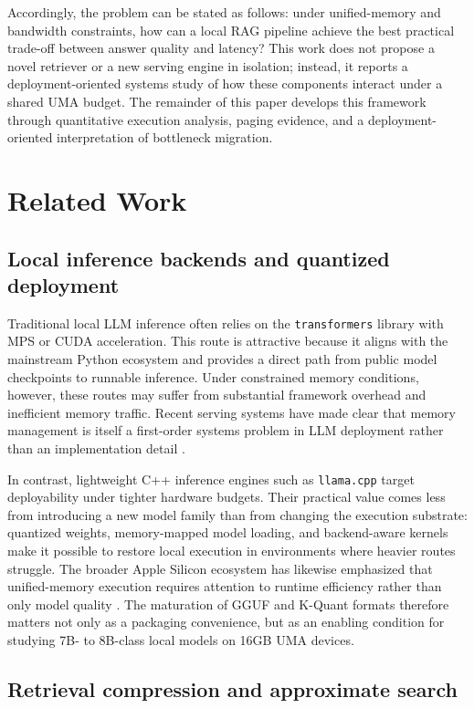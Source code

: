 \documentclass[10pt,twocolumn]{article}
\begin{document}
Accordingly, the problem can be stated as follows: under unified-memory and bandwidth constraints, how can a local RAG pipeline achieve the best practical trade-off between answer quality and latency? This work does not propose a novel retriever or a new serving engine in isolation; instead, it reports a deployment-oriented systems study of how these components interact under a shared UMA budget. The remainder of this paper develops this framework through quantitative execution analysis, paging evidence, and a deployment-oriented interpretation of bottleneck migration.

\section{Related Work}

\subsection{Local inference backends and quantized deployment}

Traditional local LLM inference often relies on the \texttt{transformers} library with MPS or CUDA acceleration. This route is attractive because it aligns with the mainstream Python ecosystem and provides a direct path from public model checkpoints to runnable inference. Under constrained memory conditions, however, these routes may suffer from substantial framework overhead and inefficient memory traffic. Recent serving systems have made clear that memory management is itself a first-order systems problem in LLM deployment rather than an implementation detail \cite{kwon2023vllm}.

In contrast, lightweight C++ inference engines such as \texttt{llama.cpp} target deployability under tighter hardware budgets. Their practical value comes less from introducing a new model family than from changing the execution substrate: quantized weights, memory-mapped model loading, and backend-aware kernels make it possible to restore local execution in environments where heavier routes struggle. The broader Apple Silicon ecosystem has likewise emphasized that unified-memory execution requires attention to runtime efficiency rather than only model quality \cite{hannun2023mlx}. The maturation of GGUF and K-Quant formats therefore matters not only as a packaging convenience, but as an enabling condition for studying 7B- to 8B-class local models on 16GB UMA devices.

\subsection{Retrieval compression and approximate search}
\end{document}
